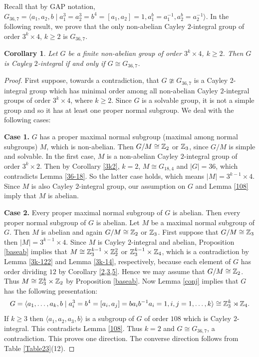 \documentclass{amsart}
\newtheorem{core}[thm]{Corollary}
\def \geq {\geqslant}
\begin{document}
Recall that by GAP notation, $G_{36,7}=\langle a_1,a_2,b\mid a_1^3=a_2^3=b^4=[a_1,a_2]=1, a_1^b=a_1^{-1}, a_2^b=a_2^{-1}\rangle$. In the following result, we prove that the only non-abelian Cayley $2$-integral group of order $3^k\times 4$, $k\geq 2$ is $G_{36,7}$.
\begin{core}\label{36main}
	Let $G$ be a finite non-abelian group of order $3^k\times 4$, $k\geq 2$. Then $G$ is Cayley $2$-integral if and only if $G\cong G_{36,7}$.
\end{core}
\begin{proof}
	First suppose, towards a contradiction, that $G\ncong G_{36,7}$ is a  Cayley $2$-integral group which has minimal order among all non-abelian Cayley $2$-integral groups of order $3^k\times 4$, where $k\geq 2$. Since $G$
	is a solvable group, it is not a simple group and so it has at least one proper normal subgroup.
	We deal with the following cases:
	
	\textbf{Case 1.} $G$ has a proper maximal normal subgroup (maximal among normal subgroups) $M$,  which is non-abelian. Then $G/M\cong \Bbb Z_2$ or $\Bbb Z_3$, since $G/M$ is simple and solvable. In the first case, $M$ is a non-abelian Cayley 
	$2$-integral group of order $3^k\times 2$. Then by Corollary \ref{3k2}, $k=2$, $M\cong G_{18,4}$ and $|G|=36$, which contradicts Lemma \ref{36-18}. So the latter case holds, which means $|M|=3^{k-1}\times 4$. Since $M$ is also Cayley $2$-integral group, our assumption on $G$ and Lemma \ref{108} imply that $M$ is abelian. 
		
	\textbf{Case 2.}  Every proper maximal normal subgroup of $G$ is abelian. Then every proper normal subgroup of $G$ is abelian. Let $M$ be a maximal normal subgroup of $G$. Then $M$ is abelian and again  $G/M\cong\Bbb Z_2$ or $\Bbb Z_3$. First suppose that  $G/M\cong\Bbb Z_3$ then $|M|=3^{k-1}\times 4$. Since $M$ is Cayley $2$-integral and abelian,  Proposition \ref{baseab} implies that $M\cong\Bbb Z_3^{k-1}\times\Bbb Z_2^2$ or $\Bbb Z_3^{k-1}\times\Bbb Z_4$, which is a contradiction by Lemma \ref{3k-122} and Lemma \ref{3k-14}, respectively, because each element of $G$ has order dividing $12$ by Corollary \ref{2,3,5}. Hence we may assume that $G/M\cong\Bbb Z_2$. Thus $M\cong\Bbb Z_3^k\times\Bbb Z_2$ by Proposition \ref{baseab}. Now Lemma \ref{conj} implies that $G$ has the following presentation:
	\[G=\langle a_1,\ldots,a_k,b\mid a_i^3=b^4=[a_i,a_j]=ba_ib^{-1}a_i=1, i,j=1,\ldots,k\rangle\cong\Bbb Z_3^k\rtimes\Bbb Z_4.\]
	If $k\geq 3$ then $\langle a_1,a_2,a_3,b\rangle$ is a subgroup of $G$ of order $108$ which is Cayley $2$-integral. This contradicts Lemma \ref{108}. Thus $k=2$ and $G\cong G_{36,7}$, a contradiction.
	This proves one direction. The converse direction follows from Table \ref{Table23}(12).
	\end{proof}
	
\end{document}
